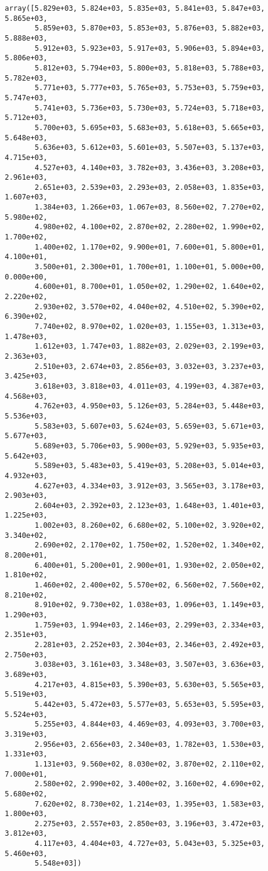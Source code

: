 \documentclass[11pt]{article}
\begin{document}
    \begin{verbatim}
array([5.829e+03, 5.824e+03, 5.835e+03, 5.841e+03, 5.847e+03, 5.865e+03,
       5.859e+03, 5.870e+03, 5.853e+03, 5.876e+03, 5.882e+03, 5.888e+03,
       5.912e+03, 5.923e+03, 5.917e+03, 5.906e+03, 5.894e+03, 5.806e+03,
       5.812e+03, 5.794e+03, 5.800e+03, 5.818e+03, 5.788e+03, 5.782e+03,
       5.771e+03, 5.777e+03, 5.765e+03, 5.753e+03, 5.759e+03, 5.747e+03,
       5.741e+03, 5.736e+03, 5.730e+03, 5.724e+03, 5.718e+03, 5.712e+03,
       5.700e+03, 5.695e+03, 5.683e+03, 5.618e+03, 5.665e+03, 5.648e+03,
       5.636e+03, 5.612e+03, 5.601e+03, 5.507e+03, 5.137e+03, 4.715e+03,
       4.527e+03, 4.140e+03, 3.782e+03, 3.436e+03, 3.208e+03, 2.961e+03,
       2.651e+03, 2.539e+03, 2.293e+03, 2.058e+03, 1.835e+03, 1.607e+03,
       1.384e+03, 1.266e+03, 1.067e+03, 8.560e+02, 7.270e+02, 5.980e+02,
       4.980e+02, 4.100e+02, 2.870e+02, 2.280e+02, 1.990e+02, 1.700e+02,
       1.400e+02, 1.170e+02, 9.900e+01, 7.600e+01, 5.800e+01, 4.100e+01,
       3.500e+01, 2.300e+01, 1.700e+01, 1.100e+01, 5.000e+00, 0.000e+00,
       4.600e+01, 8.700e+01, 1.050e+02, 1.290e+02, 1.640e+02, 2.220e+02,
       2.930e+02, 3.570e+02, 4.040e+02, 4.510e+02, 5.390e+02, 6.390e+02,
       7.740e+02, 8.970e+02, 1.020e+03, 1.155e+03, 1.313e+03, 1.478e+03,
       1.612e+03, 1.747e+03, 1.882e+03, 2.029e+03, 2.199e+03, 2.363e+03,
       2.510e+03, 2.674e+03, 2.856e+03, 3.032e+03, 3.237e+03, 3.425e+03,
       3.618e+03, 3.818e+03, 4.011e+03, 4.199e+03, 4.387e+03, 4.568e+03,
       4.762e+03, 4.950e+03, 5.126e+03, 5.284e+03, 5.448e+03, 5.536e+03,
       5.583e+03, 5.607e+03, 5.624e+03, 5.659e+03, 5.671e+03, 5.677e+03,
       5.689e+03, 5.706e+03, 5.900e+03, 5.929e+03, 5.935e+03, 5.642e+03,
       5.589e+03, 5.483e+03, 5.419e+03, 5.208e+03, 5.014e+03, 4.932e+03,
       4.627e+03, 4.334e+03, 3.912e+03, 3.565e+03, 3.178e+03, 2.903e+03,
       2.604e+03, 2.392e+03, 2.123e+03, 1.648e+03, 1.401e+03, 1.225e+03,
       1.002e+03, 8.260e+02, 6.680e+02, 5.100e+02, 3.920e+02, 3.340e+02,
       2.690e+02, 2.170e+02, 1.750e+02, 1.520e+02, 1.340e+02, 8.200e+01,
       6.400e+01, 5.200e+01, 2.900e+01, 1.930e+02, 2.050e+02, 1.810e+02,
       1.460e+02, 2.400e+02, 5.570e+02, 6.560e+02, 7.560e+02, 8.210e+02,
       8.910e+02, 9.730e+02, 1.038e+03, 1.096e+03, 1.149e+03, 1.290e+03,
       1.759e+03, 1.994e+03, 2.146e+03, 2.299e+03, 2.334e+03, 2.351e+03,
       2.281e+03, 2.252e+03, 2.304e+03, 2.346e+03, 2.492e+03, 2.750e+03,
       3.038e+03, 3.161e+03, 3.348e+03, 3.507e+03, 3.636e+03, 3.689e+03,
       4.217e+03, 4.815e+03, 5.390e+03, 5.630e+03, 5.565e+03, 5.519e+03,
       5.442e+03, 5.472e+03, 5.577e+03, 5.653e+03, 5.595e+03, 5.524e+03,
       5.255e+03, 4.844e+03, 4.469e+03, 4.093e+03, 3.700e+03, 3.319e+03,
       2.956e+03, 2.656e+03, 2.340e+03, 1.782e+03, 1.530e+03, 1.331e+03,
       1.131e+03, 9.560e+02, 8.030e+02, 3.870e+02, 2.110e+02, 7.000e+01,
       2.580e+02, 2.990e+02, 3.400e+02, 3.160e+02, 4.690e+02, 5.680e+02,
       7.620e+02, 8.730e+02, 1.214e+03, 1.395e+03, 1.583e+03, 1.800e+03,
       2.275e+03, 2.557e+03, 2.850e+03, 3.196e+03, 3.472e+03, 3.812e+03,
       4.117e+03, 4.404e+03, 4.727e+03, 5.043e+03, 5.325e+03, 5.460e+03,
       5.548e+03])
    \end{verbatim}
\end{document}
